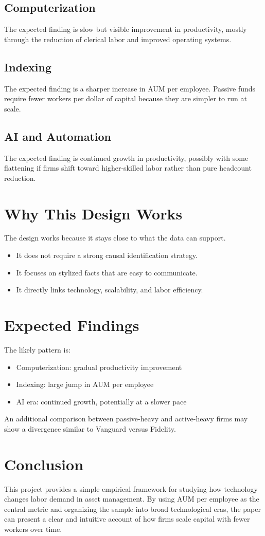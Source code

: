 \documentclass{article}
\begin{document}
\subsection{Computerization}
The expected finding is slow but visible improvement in productivity, mostly through the reduction of clerical labor and improved operating systems.

\subsection{Indexing}
The expected finding is a sharper increase in AUM per employee. Passive funds require fewer workers per dollar of capital because they are simpler to run at scale.

\subsection{AI and Automation}
The expected finding is continued growth in productivity, possibly with some flattening if firms shift toward higher-skilled labor rather than pure headcount reduction.

\section{Why This Design Works}
The design works because it stays close to what the data can support.

\begin{itemize}
  \item It does not require a strong causal identification strategy.
  \item It focuses on stylized facts that are easy to communicate.
  \item It directly links technology, scalability, and labor efficiency.
\end{itemize}

\section{Expected Findings}
The likely pattern is:

\begin{itemize}
  \item Computerization: gradual productivity improvement
  \item Indexing: large jump in AUM per employee
  \item AI era: continued growth, potentially at a slower pace
\end{itemize}

An additional comparison between passive-heavy and active-heavy firms may show a divergence similar to Vanguard versus Fidelity.

\section{Conclusion}
This project provides a simple empirical framework for studying how technology changes labor demand in asset management. By using AUM per employee as the central metric and organizing the sample into broad technological eras, the paper can present a clear and intuitive account of how firms scale capital with fewer workers over time.


\end{document}
